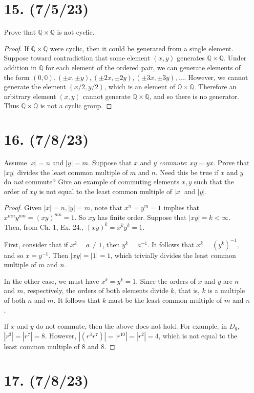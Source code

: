 \documentclass{article}
\begin{document}
\section*{15. (7/5/23)}

Prove that $\mathbb{Q} \times \mathbb{Q}$ is not cyclic.

\begin{proof}
    If $\mathbb{Q} \times \mathbb{Q}$ were cyclic, then it could be generated from a single element. Suppose toward contradiction that some element $(x, y)$ generates $\mathbb{Q} \times \mathbb{Q}$. Under addition in $\mathbb{Q}$ for each element of the ordered pair, we can generate elements of the form $(0, 0), (\pm x, \pm y), (\pm 2x, \pm 2y), (\pm 3x, \pm 3y), ...$. However, we cannot generate the element $(x/2, y/2)$, which is an element of $\mathbb{Q} \times \mathbb{Q}$. Therefore an arbitrary element $(x, y)$ cannot generate $\mathbb{Q} \times \mathbb{Q}$, and so there is no generator. Thus $\mathbb{Q} \times \mathbb{Q}$ is not a cyclic group.
\end{proof}

\section*{16. (7/8/23)}

Assume $|x| = n$ and $|y| = m$. Suppose that $x$ and $y$ \emph{commute}: $xy = yx$. Prove that $|xy|$ divides the least common multiple of $m$ and $n$. Need this be true if $x$ and $y$ do \emph{not} commute? Give an example of commuting elements $x, y$ such that the order of $xy$ is not equal to the least common multiple of $|x|$ and $|y|$.

\begin{proof}
    Given $|x| = n, |y| = m$, note that $x^n = y^m = 1$ implies that $x^{mn} y^{mn} = (xy)^{mn} = 1$. So $xy$ has finite order. Suppose that $|xy| = k < \infty$. Then, from Ch. 1, Ex. 24., $(xy)^k = x^k y^k = 1$.
    
    First, consider that if $x^k = a \neq 1$, then $y^k = a^{-1}$. It follows that $x^k = (y^k)^{-1}$, and so $x = y^{-1}$. Then $|xy| = |1| = 1$, which trivially divides the least common multiple of $m$ and $n$.

    In the other case, we must have $x^k = y^k = 1$. Since the orders of $x$ and $y$ are $n$ and $m$, respectively, the orders of both elements divide $k$, that is, $k$ is a multiple of both $n$ and $m$. It follows that $k$ must be the least common multiple of $m$ and $n$.

    If $x$ and $y$ do not commute, then the above does not hold. For example, in $D_8$, $|r^3| = |r^7| = 8$. However, $|(r^3 r^7)| = |r^{10}| = |r^2| = 4$, which is not equal to the least common multiple of 8 and 8.
\end{proof}

\section*{17. (7/8/23)}
\end{document}

